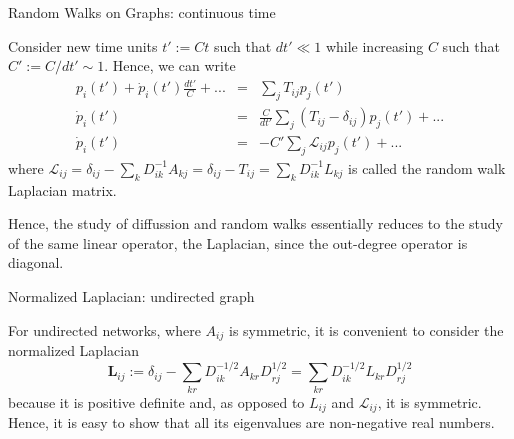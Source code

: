 \documentclass{beamer}
\begin{document}

\begin{frame}{Random Walks on Graphs: continuous time}

Consider new time units $t':=Ct$ such that $dt' \ll 1$ while increasing $C$ such that $C':=C/dt' \sim 1$.
Hence, we can write
\begin{eqnarray}
p_i(t') 
+ 
\dot{p}_i(t') 
\frac{dt'}{C}
+ ...
&=&
\sum_j
T_{ij}
p_j(t')
\\
\dot{p}_i(t')
&=&
\frac{C}{dt'}
\sum_j
\left(
T_{ij}
-
\delta_{ij}
\right)
p_j(t')
+
...
\nonumber
\\
\dot{p}_i(t')
&= &
-
C'
\sum_j
\mathcal{L}_{ij}
p_j(t')
+
...
\nonumber
\end{eqnarray}
where 
$\mathcal{L}_{ij}
=
\delta_{ij}
-
\sum_k D_{ik}^{-1} A_{kj}
=
\delta_{ij}
-
T_{ij}
=
\sum_k
D_{ik}^{-1}L_{kj}$
is called the random walk Laplacian matrix.

\vspace{0.25cm}

Hence, the study of diffussion and random walks essentially reduces to the study of the same linear operator, the Laplacian, since the out-degree operator is diagonal.

\end{frame}


\begin{frame}{Normalized Laplacian: undirected graph}

For undirected networks, where $A_{ij}$ is symmetric, it is convenient to consider the normalized Laplacian
\begin{equation}
\mathbf{L}_{ij}
:=
\delta_{ij}
-
\sum_{kr}
D_{ik}^{-1/2} 
A_{kr}
D_{rj}^{1/2} 
=
\sum_{kr}
D_{ik}^{-1/2} 
L_{kr}
D_{rj}^{1/2} 
\end{equation}
because it is positive definite and, as opposed to $L_{ij}$ and $\mathcal{L}_{ij}$, it is symmetric. 
Hence, it is easy to show that all its eigenvalues are non-negative real numbers.

\end{frame}

\end{document}
